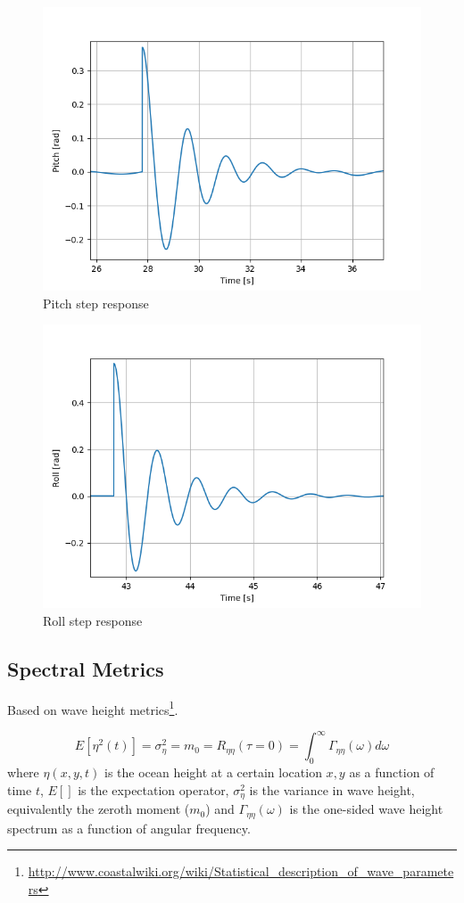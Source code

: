 \documentclass[11pt, letterpaper]{article}
\begin{document}
\begin{figure}[hb!]
\centering
\includegraphics[width=0.6\linewidth]{./src/usv_param_est/pitch_step.png}
\caption{Pitch step response}
\label{f:p}
\end{figure}

\begin{figure}[hb!]
\centering
\includegraphics[width=0.6\linewidth]{./src/usv_param_est/roll_step.png}
\caption{Roll step response}
\label{f:r}
\end{figure}


\clearpage

\subsection{Spectral Metrics}

Based on wave height metrics\footnote{\url{http://www.coastalwiki.org/wiki/Statistical_description_of_wave_parameters}}.

\begin{equation}
  E[\eta^2(t)] = \sigma_{\eta}^2 = m_0 = R_{\eta \eta}(\tau=0)  =  \int_{0}^{\infty}\Gamma_{\eta \eta}(\omega) d\omega
\end{equation}
where $\eta(x,y,t)$ is the ocean height at a certain location $x,y$ as a function of time $t$, $E[]$ is the expectation operator, $\sigma_{\eta}^2$ is the variance in wave height, equivalently the zeroth moment ($m_0$) and $\Gamma_{\eta \eta}(\omega)$ is the one-sided wave height spectrum as a function of angular frequency.
\end{document}
